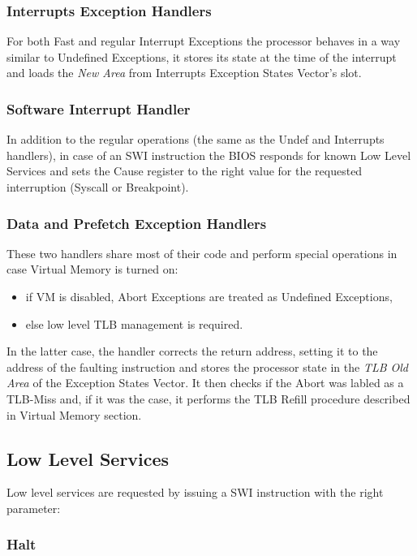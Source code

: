 \subsubsection{Interrupts Exception Handlers}

For both Fast and regular Interrupt Exceptions the processor behaves in a way similar to Undefined Exceptions, it stores its state at the time of the interrupt and loads the \emph{New Area} from Interrupts Exception States Vector's slot.

\subsubsection{Software Interrupt Handler}

In addition to the regular operations (the same as the Undef and Interrupts handlers), in case of an SWI instruction the BIOS responds for known Low Level Services and sets the Cause register to the right value for the requested interruption (Syscall or Breakpoint).

\subsubsection{Data and Prefetch Exception Handlers}

These two handlers share most of their code and perform special operations in case Virtual Memory is turned on:
\begin{itemize}
	\item if VM is disabled, Abort Exceptions are treated as Undefined Exceptions,
	\item else low level TLB management is required.
\end{itemize}

In the latter case, the handler corrects the return address, setting it to the address of the faulting instruction and stores the processor state in the \emph{TLB Old Area} of the Exception States Vector.
It then checks if the Abort was labled as a TLB-Miss and, if it was the case, it performs the TLB Refill procedure described in Virtual Memory section.

\subsection{Low Level Services}

Low level services are requested by issuing a SWI instruction with the right parameter:

\subsubsection{Halt}

